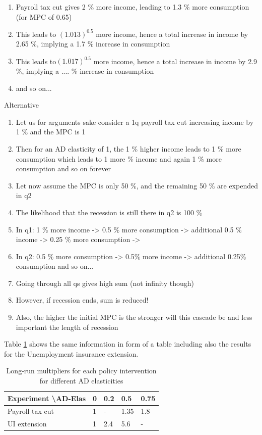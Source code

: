 \documentclass[]{article}
\begin{document}
\begin{enumerate}
	\item Payroll tax cut gives 2 \% more income, leading to 1.3 \% more consumption (for MPC of 0.65)
	\item This leads to $(1.013)^{0.5}$ more income, hence a total increase in income by 2.65 \%, implying a 1.7 \% increase in consumption
	\item This leads to$(1.017)^{0.5}$ more income, hence a total increase in income by 2.9 \%, implying a .... \% increase in consumption
	\item and so on...
\end{enumerate}

Alternative

\begin{enumerate}
	\item Let us for arguments sake consider a 1q payroll tax cut increasing income by 1 \% and the MPC is 1
	\item Then for an AD elasticity of 1, the 1 \% higher income leads to 1 \% more consumption which leads to 1 more \% income and again 1 \% more consumption and so on forever
	\item Let now assume the MPC is only 50 \%, and the remaining 50 \% are expended in q2
	\item The likelihood that the recession is still there in q2 is 100 \%
	\item In q1: 1 \% more income -> 0.5 \% more consumption -> additional 0.5 \% income -> 0.25 \% more consumption ->
	\item In q2: 0.5 \% more consumption -> 0.5\% more income -> additional 0.25\% consumption and so on...
	\item Going through all qs gives high sum (not infinity though)
	\item However, if recession ends, sum is reduced!
	\item Also, the higher the initial MPC is the stronger will this cascade be and less important the length of recession
\end{enumerate}


Table \ref{tab:NPVADelas} shows the same information in form of a table including also the results for the Unemployment insurance extension.

\begin{table}[htb]
	\centering
	\begin{tabular}{@{}lllll@{}}
		\toprule
		Experiment \textbackslash AD-Elas & 0 & 0.2 & 0.5  & 0.75 \\ \midrule
		Payroll tax cut                   & 1 & -   & 1.35 & 1.8  \\
		UI extension                      & 1 & 2.4 & 5.6  & -    \\ \bottomrule
	\end{tabular}	
	\caption{Long-run multipliers for each policy intervention for different AD elasticities}
	\label{tab:NPVADelas}
\end{table}
\end{document}
